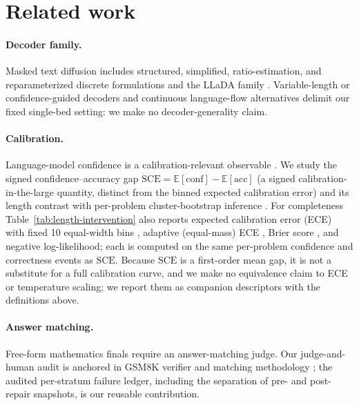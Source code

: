 \documentclass{article}
\begin{document}
\section{Related work}
\label{sec:related}

\paragraph{Decoder family.}
Masked text diffusion includes structured, simplified, ratio-estimation, and
reparameterized discrete formulations
\citep{austin2021structured,shi2024simplified,lou2024discrete,zheng2023reparameterized}
and the LLaDA family \citep{nie2025large,nie2026improved}.  Variable-length or
confidence-guided decoders \citep{li2025beyond,sun2026dystruct,wang2026reversible}
and continuous language-flow alternatives \citep{hu2026elf} delimit our fixed
single-bed setting: we make no decoder-generality claim.

\paragraph{Calibration.}
Language-model confidence is a calibration-relevant observable
\citep{kadavath2022language}.  We study the signed confidence--accuracy gap
$\mathrm{SCE}=\mathbb{E}[\mathrm{conf}]-\mathbb{E}[\mathrm{acc}]$ (a signed
calibration-in-the-large quantity, distinct from the binned expected calibration
error) and its length contrast with per-problem cluster-bootstrap inference
\citep{davison1997bootstrap}.  For completeness Table~\ref{tab:length-intervention}
also reports expected calibration error (ECE) with fixed 10 equal-width bins
\citep{guo2017calibration}, adaptive (equal-mass) ECE
\citep{naeini2015obtaining}, Brier score \citep{brier1950verification}, and negative
log-likelihood; each is computed on the same per-problem confidence and correctness
events as $\mathrm{SCE}$.  Because $\mathrm{SCE}$ is a first-order mean gap, it is
not a substitute for a full calibration curve, and we make no equivalence claim to
ECE or temperature scaling; we report them as companion descriptors with the
definitions above.

\paragraph{Answer matching.}
Free-form mathematics finals require an answer-matching judge.  Our judge-and-human
audit is anchored in GSM8K verifier and matching methodology
\citep{cobbe2021gsm8k}; the audited per-stratum failure ledger, including the
separation of pre- and post-repair snapshots, is our reusable contribution.
\end{document}
